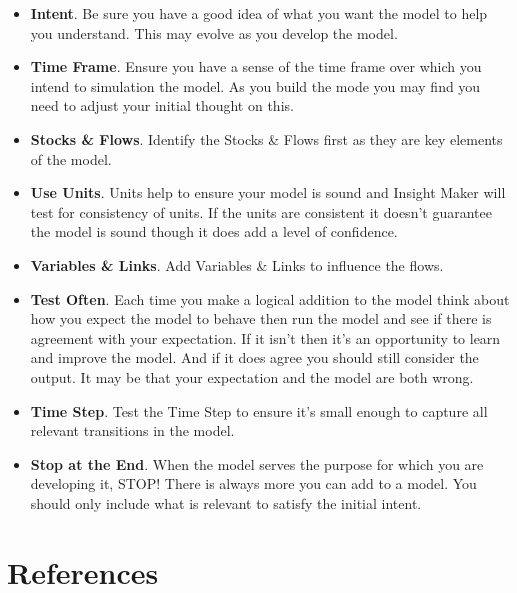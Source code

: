 \documentclass[]{memoir}
\begin{document}
\begin{itemize}
\itemsep1pt\parskip0pt
\item
  \textbf{Intent}. Be sure you have a good idea of what you want the
  model to help you understand. This may evolve as you develop the
  model.
\item
  \textbf{Time Frame}. Ensure you have a sense of the time frame over
  which you intend to simulation the model. As you build the mode you
  may find you need to adjust your initial thought on this.
\item
  \textbf{Stocks \& Flows}. Identify the Stocks \& Flows first as they
  are key elements of the model.
\item
  \textbf{Use Units}. Units help to ensure your model is sound and
  Insight Maker will test for consistency of units. If the units are
  consistent it doesn't guarantee the model is sound though it does add
  a level of confidence.
\item
  \textbf{Variables \& Links}. Add Variables \& Links to influence the
  flows.
\item
  \textbf{Test Often}. Each time you make a logical addition to the
  model think about how you expect the model to behave then run the
  model and see if there is agreement with your expectation. If it isn't
  then it's an opportunity to learn and improve the model. And if it
  does agree you should still consider the output. It may be that your
  expectation and the model are both wrong.
\item
  \textbf{Time Step}. Test the Time Step to ensure it's small enough to
  capture all relevant transitions in the model.
\item
  \textbf{Stop at the End}. When the model serves the purpose for which
  you are developing it, STOP! There is always more you can add to a
  model. You should only include what is relevant to satisfy the initial
  intent.
\end{itemize}

\section{References}
\end{document}
